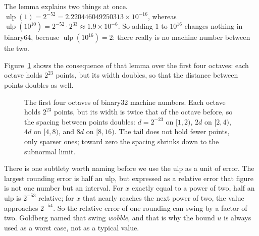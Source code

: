 The lemma explains two things at once.
$\operatorname{ulp}(1)=2^{-52}=2.220446049250313\times10^{-16}$, whereas
$\operatorname{ulp}(10^{10})=2^{-52}\cdot2^{33}\approx1.9\times10^{-6}$. So
adding $1$ to $10^{16}$ changes nothing in binary64, because
$\operatorname{ulp}(10^{16})=2$: there really is no machine number between the two.

Figure~\ref{fig:titikmesin} shows the consequence of that lemma over the first four
octaves: each octave holds $2^{23}$ points, but its width doubles, so that the
distance between points doubles as well.

\begin{figure}[htbp]
\centering
{}
\caption{The first four octaves of binary32 machine numbers. Each octave holds $2^{23}$
points, but its width is twice that of the octave before, so the spacing between points
doubles: $d=2^{-23}$ on $[1,2)$, $2d$ on $[2,4)$, $4d$ on $[4,8)$, and $8d$ on
$[8,16)$. The tail does not hold fewer points, only sparser ones; toward zero the
spacing shrinks down to the subnormal limit.}
\label{fig:titikmesin}
\end{figure}

There is one subtlety worth naming before we use the ulp as a unit of error. The largest
rounding error is half an ulp, but expressed as a relative error that figure is not one
number but an interval. For $x$ exactly equal to a power of two, half an ulp is
$2^{-53}$ relative; for $x$ that nearly reaches the next power of two, the value
approaches $2^{-54}$. So the relative error of one rounding can swing by a factor of
two. Goldberg named that swing \emph{wobble}, and that is why the bound $u$ is always
used as a worst case, not as a typical value.

